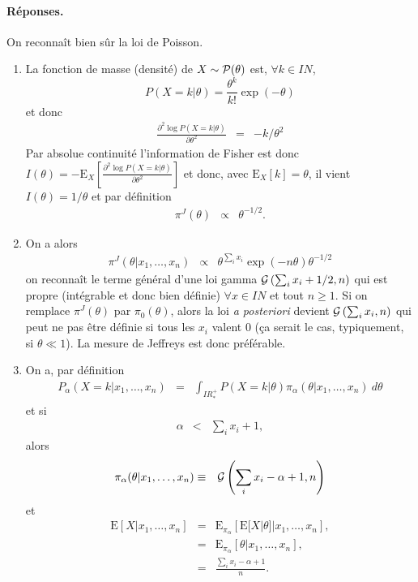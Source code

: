 \documentclass[10pt]{article}
\newcommand{\R}{I\!\!R}
\newcommand{\N}{I\!\!N}
\newcommand{\E}{\mbox{E}}
\newcommand{\1}{\mathbbm{1}}
\begin{document}
\paragraph{\bf R\'eponses.}
On reconna\^it bien s\^ur la loi de Poisson. 
\begin{enumerate}
\item La fonction de masse (densit\'e) de $X\sim {\cal{P}}(\theta)$ est, $\forall k\in\N$, 
$$
P(X=k|\theta) = \frac{\theta^k}{k!}\exp(-\theta) 
$$
et donc
\begin{eqnarray*}
\frac{\partial^2 \log P(X=k|\theta)}{\partial \theta^2} &= & -k/\theta^2
\end{eqnarray*}
Par absolue continuit\'e l'information de Fisher est donc $I(\theta)=-\E_X\left[\frac{\partial^2 \log P(X=k|\theta)}{\partial \theta^2}\right]$ et donc, avec $\E_X[k]=\theta$, il vient  $I(\theta)=1/\theta$ et par d\'efinition
\begin{eqnarray*}
\pi^J(\theta) & \propto & \theta^{-1/2}.
\end{eqnarray*}
\item On a alors
\begin{eqnarray*}
\pi^J(\theta|x_1,\ldots,x_n) & \propto & \theta^{\sum_i x_i} \exp\left(-n\theta\right) \theta^{-1/2}
\end{eqnarray*}
on reconna\^it le terme g\'en\'eral d'une loi gamma ${\cal{G}}\left(\sum_i x_i+1/2,n\right)$ qui est propre (int\'egrable et donc bien d\'efinie) $\forall x\in\N$ et tout $n\geq 1$. Si on remplace $\pi^J(\theta)$ par $\pi_0(\theta)$, alors la loi {\it a posteriori} devient ${\cal{G}}\left(\sum_i x_i,n\right)$ qui peut ne pas \^etre d\'efinie si tous les $x_i$ valent 0 (\c ca serait le cas, typiquement, si $\theta\ll 1$). La mesure de Jeffreys est donc pr\'ef\'erable.
\item On a, par d\'efinition
\begin{eqnarray}
P_{\alpha}(X=k|x_1,\ldots,x_n) & = & \int_{\R^+_*} P(X=k|\theta)\pi_{\alpha}(\theta|x_1,\ldots,x_n)\ d\theta \label{eq1}
\end{eqnarray}
et si 
\begin{eqnarray}
\alpha & < & \sum_i x_i+1, \label{cond1}
\end{eqnarray}
alors
\begin{eqnarray}
\pi_{\alpha}(\theta|x_1,\ldots,x_n) & \equiv & {\cal{G}}\left(\sum_i x_i-\alpha+1,n\right) \label{eq2}
\end{eqnarray}
et 
\begin{eqnarray*}
\E[X|x_1,\ldots,x_n] &= & \E_{\pi_{\alpha}}\left[\E[X|\theta] | x_1,\ldots,x_n\right], \\
& = &  \E_{\pi_{\alpha}}\left[\theta | x_1,\ldots,x_n\right], \\
& = & \frac{\sum_i x_i-\alpha+1}{n}.
\end{eqnarray*}


\end{enumerate}
\end{document}
